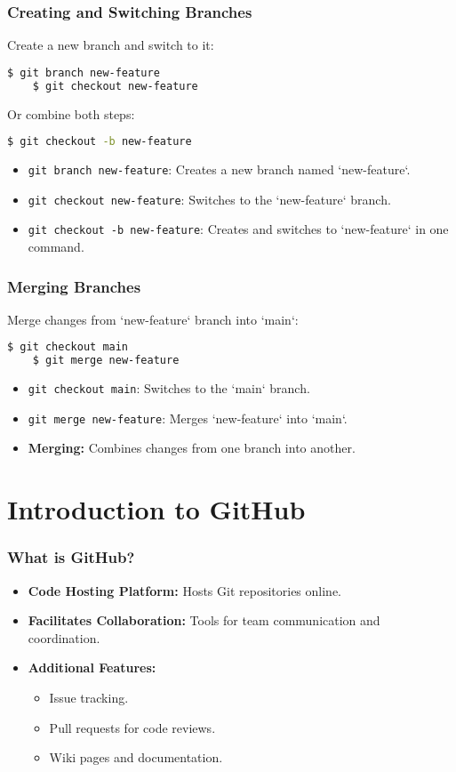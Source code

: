 \begin{frame}[fragile]
	\frametitle{Creating and Switching Branches}
	Create a new branch and switch to it:
	\begin{lstlisting}[language=bash]
	$ git branch new-feature
	$ git checkout new-feature
	\end{lstlisting}
	Or combine both steps:
	\begin{lstlisting}[language=bash]
	$ git checkout -b new-feature
	\end{lstlisting}
	\begin{itemize}
		\item \texttt{git branch new-feature}: Creates a new branch named `new-feature`.
		\item \texttt{git checkout new-feature}: Switches to the `new-feature` branch.
		\item \texttt{git checkout -b new-feature}: Creates and switches to `new-feature` in one command.
	\end{itemize}
\end{frame}

\begin{frame}[fragile]
	\frametitle{Merging Branches}
	Merge changes from `new-feature` branch into `main`:
	\begin{lstlisting}[language=bash]
	$ git checkout main
	$ git merge new-feature
	\end{lstlisting}
	\begin{itemize}
		\item \texttt{git checkout main}: Switches to the `main` branch.
		\item \texttt{git merge new-feature}: Merges `new-feature` into `main`.
		\item \textbf{Merging:} Combines changes from one branch into another.
	\end{itemize}
\end{frame}

\section{Introduction to GitHub}

\begin{frame}
	\frametitle{What is GitHub?}
	\begin{itemize}
		\item \textbf{Code Hosting Platform:} Hosts Git repositories online.
		\item \textbf{Facilitates Collaboration:} Tools for team communication and coordination.
		\item \textbf{Additional Features:}
		\begin{itemize}
			\item Issue tracking.
			\item Pull requests for code reviews.
			\item Wiki pages and documentation.
		\end{itemize}
	\end{itemize}
\end{frame}

